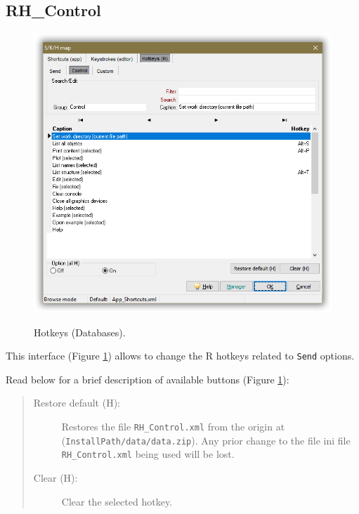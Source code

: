 \subsection{RH\_Control}

\begin{figure}[H]
  \includegraphics[scale=0.35]{./res/skh_map_rh_control_dlg.png}\\
  \caption{Hotkeys (Databases).}
  \label{fig:rh_control_dlg}
\end{figure}

This interface
(Figure \ref{fig:rh_control_dlg})
allows to change the R hotkeys related to \texttt{Send} options.

Read below for a brief description of available buttons (Figure \ref{fig:rh_control_dlg}):

\begin{quote}
  \begin{footnotesize}
    \begin{description}
      \item[Restore default (H):]
        Restores the file \texttt{RH\_Control.xml} from the origin at
        (\texttt{InstallPath/data/data.zip}). Any prior change to the file ini file
        \texttt{RH\_Control.xml} being used will be lost.
      \item[Clear (H):]
        Clear the selected hotkey.
    \end{description}
  \end{footnotesize}
\end{quote}


